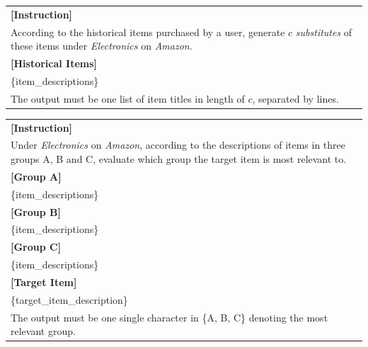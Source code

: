 
\begin{promptbox}
\small
\begin{tabularx}{\linewidth}{X}
\toprule
\textbf{[Instruction]}\\
According to the historical items purchased by a user, generate \emph{$c$} \emph{substitutes} of these items under \emph{Electronics} on \emph{Amazon}.\\[0.4em]
\textbf{[Historical Items]}\\
\{item\_descriptions\}\\[0.4em]
The output must be one list of item titles in length of \emph{$c$}, separated by lines.\\
\bottomrule
\end{tabularx}
\end{promptbox}
\label{app:tab:gen_subs}

\begin{promptbox}
\small
\begin{tabularx}{\linewidth}{X}
\toprule
\textbf{[Instruction]}\\
Under \emph{Electronics} on \emph{Amazon}, according to the descriptions of items in three groups A, B and C, evaluate which group the target item is most relevant to.\\[0.4em]
\textbf{[Group A]}\\
\{item\_descriptions\}\\[0.4em]
\textbf{[Group B]}\\
\{item\_descriptions\}\\[0.4em]
\textbf{[Group C]}\\
\{item\_descriptions\}\\[0.4em]
\textbf{[Target Item]}\\
\{target\_item\_description\}\\[0.4em]
The output must be one single character in \{A, B, C\} denoting the most relevant group.\\
\bottomrule
\end{tabularx}
\end{promptbox}
\label{app:tab:cpr}
\medskip

